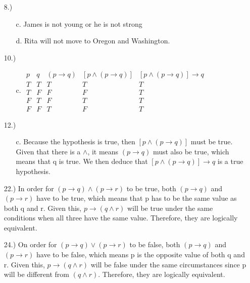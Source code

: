 \documentclass{article}
\begin{document}
\begin{enumerate}

\item[8.)]

\begin{enumerate}

\item[c.] James is not young or he is not strong

\item[d.] Rita will not move to Oregon and Washington.

\end{enumerate}

\item[10.)]

\begin{enumerate}

\item[c.] $\begin{array}{cc|c|c|c} p & q & (p \rightarrow q) & [p \wedge (p \rightarrow q)] & [p \wedge (p \rightarrow q)] \rightarrow q \\ \hline T & T & T & T & T \\ T & F & F & F & T \\ F & T & F & T & T \\ F & F & T & F & T \end{array}$ 

\end{enumerate}

\item[12.)]

\begin{enumerate}

\item[c.] Because the hypothesis is true, then $[p \wedge (p \rightarrow q)]$ must be true. Given that there is a $\wedge$, it means $(p \rightarrow q)$ must also be true, which means that q is true. We then deduce that $[p \wedge (p \rightarrow q)] \rightarrow q$ is a true hypothesis.

\end{enumerate}

\item[22.)] In order for $(p \rightarrow q) \wedge (p \rightarrow r)$ to be true, both $(p \rightarrow q)$ and $(p \rightarrow r)$ have to be true, which means that p has to be the same value as both q and r. Given this, $p \rightarrow (q \wedge r)$ will be true under the same conditions when all three have the same value. Therefore, they are logically equivalent.

\item[24.)] On order for $(p \rightarrow q) \vee (p \rightarrow r)$ to be false, both $(p \rightarrow q)$ and $(p \rightarrow r)$ have to be false, which means p is the opposite value of both q and r. Given this,  $p \rightarrow (q \wedge r)$ will be false under the same circumstances since p will be different from $(q \wedge r)$. Therefore, they are logically equivalent.

\end{enumerate}
\end{document}
